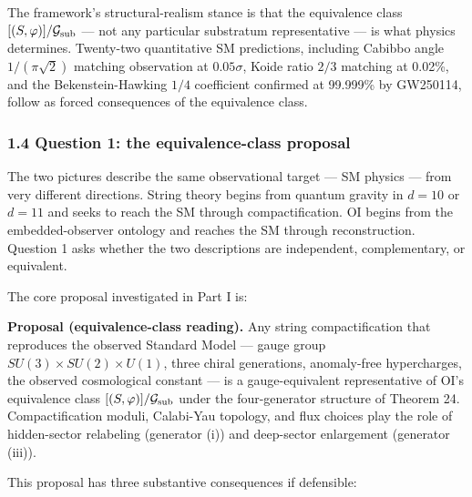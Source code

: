 \documentclass[
]{article}
\begin{document}
The framework's structural-realism stance is that the equivalence class
\([(S, \varphi)]/\mathcal{G}_{\rm sub}\) --- not any particular
substratum representative --- is what physics determines. Twenty-two
quantitative SM predictions, including Cabibbo angle \(1/(\pi\sqrt{2})\)
matching observation at \(0.05\sigma\), Koide ratio \(2/3\) matching at
0.02\%, and the Bekenstein-Hawking \(1/4\) coefficient confirmed at
99.999\% by GW250114, follow as forced consequences of the equivalence
class.

\hypertarget{question-1-the-equivalence-class-proposal}{%
\subsubsection{1.4 Question 1: the equivalence-class
proposal}\label{question-1-the-equivalence-class-proposal}}

The two pictures describe the same observational target --- SM physics
--- from very different directions. String theory begins from quantum
gravity in \(d=10\) or \(d=11\) and seeks to reach the SM through
compactification. OI begins from the embedded-observer ontology and
reaches the SM through reconstruction. Question 1 asks whether the two
descriptions are independent, complementary, or equivalent.

The core proposal investigated in Part I is:

\textbf{Proposal (equivalence-class reading).} Any string
compactification that reproduces the observed Standard Model --- gauge
group \(SU(3) \times SU(2) \times U(1)\), three chiral generations,
anomaly-free hypercharges, the observed cosmological constant --- is a
gauge-equivalent representative of OI's equivalence class
\([(S, \varphi)]/\mathcal{G}_{\rm sub}\) under the four-generator
structure of Theorem 24. Compactification moduli, Calabi-Yau topology,
and flux choices play the role of hidden-sector relabeling (generator
(i)) and deep-sector enlargement (generator (iii)).

This proposal has three substantive consequences if defensible:
\end{document}
